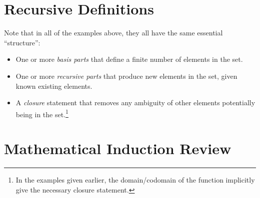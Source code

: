 \section{Recursive Definitions}

Note that in all of the examples above, they all have the same essential ``structure'':
\begin{itemize}
	\item One or more \emph{basis parts} that define a finite number of elements in the set.
	\item One or more \emph{recursive parts} that produce new elements in the set, given known existing elements.
	\item A \emph{closure} statement that removes any ambiguity of other elements potentially being in the set.\footnote{In the examples given earlier, the domain/codomain of the function implicitly give the necessary closure statement.}
\end{itemize}

\section{Mathematical Induction Review}

